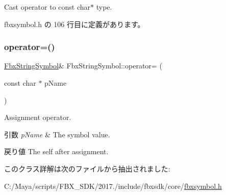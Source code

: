 Cast operator to const char$\ast$ type. 



 fbxsymbol.\+h の 106 行目に定義があります。

\mbox{\label{class_fbx_string_symbol_a603854f158e237324bce01f8947c55b4}} 
\subsubsection{\texorpdfstring{operator=()}{operator=()}}
{\footnotesize\ttfamily \hyperlink{class_fbx_string_symbol}{Fbx\+String\+Symbol}\& Fbx\+String\+Symbol\+::operator= (\begin{DoxyParamCaption}\item[{const char $\ast$}]{p\+Name }\end{DoxyParamCaption})}

Assignment operator. 
\begin{DoxyParams}{引数}
{\em p\+Name} & The symbol value. \\
\hline
\end{DoxyParams}
\begin{DoxyReturn}{戻り値}
The self after assignment. 
\end{DoxyReturn}


このクラス詳解は次のファイルから抽出されました\+:\begin{DoxyCompactItemize}
\item 
C\+:/\+Maya/scripts/\+F\+B\+X\+\_\+\+S\+D\+K/2017./include/fbxsdk/core/\hyperlink{fbxsymbol_8h}{fbxsymbol.\+h}\end{DoxyCompactItemize}
